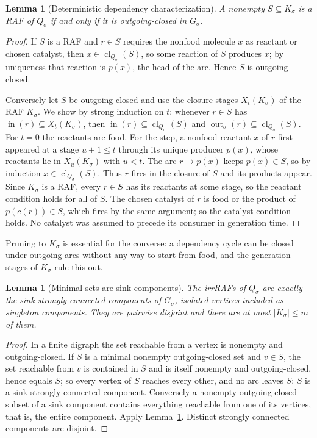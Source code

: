 \documentclass[11pt,a4paper]{article}
\theoremstyle{plain}
\newtheorem{lemma}[theorem]{Lemma}
\theoremstyle{definition}
\theoremstyle{remark}
\newcommand{\cl}{\operatorname{cl}}
\newcommand{\inp}{\operatorname{in}}
\newcommand{\out}{\operatorname{out}}
\begin{document}
\begin{lemma}[Deterministic dependency characterization]\label{lem:det}
A nonempty $S\subseteq K_\sigma$ is a RAF of $Q_\sigma$ if and only if it is outgoing-closed in $G_\sigma$.
\end{lemma}
\begin{proof}
If $S$ is a RAF and $r\in S$ requires the nonfood molecule $x$ as reactant or chosen catalyst, then $x\in\cl_{Q_\sigma}(S)$, so some reaction of $S$ produces $x$; by uniqueness that reaction is $p(x)$, the head of the arc. Hence $S$ is outgoing-closed.

Conversely let $S$ be outgoing-closed and use the closure stages $X_t(K_\sigma)$ of the RAF $K_\sigma$. We show by strong induction on $t$: whenever $r\in S$ has $\inp(r)\subseteq X_t(K_\sigma)$, then $\inp(r)\subseteq\cl_{Q_\sigma}(S)$ and $\out_\sigma(r)\subseteq\cl_{Q_\sigma}(S)$. For $t=0$ the reactants are food. For the step, a nonfood reactant $x$ of $r$ first appeared at a stage $u+1\le t$ through its unique producer $p(x)$, whose reactants lie in $X_u(K_\sigma)$ with $u<t$. The arc $r\to p(x)$ keeps $p(x)\in S$, so by induction $x\in\cl_{Q_\sigma}(S)$. Thus $r$ fires in the closure of $S$ and its products appear. Since $K_\sigma$ is a RAF, every $r\in S$ has its reactants at some stage, so the reactant condition holds for all of $S$. The chosen catalyst of $r$ is food or the product of $p(c(r))\in S$, which fires by the same argument; so the catalyst condition holds. No catalyst was assumed to precede its consumer in generation time.
\end{proof}

Pruning to $K_\sigma$ is essential for the converse: a dependency cycle can be closed under outgoing arcs without any way to start from food, and the generation stages of $K_\sigma$ rule this out.

\begin{lemma}[Minimal sets are sink components]\label{lem:sink}
The irrRAFs of $Q_\sigma$ are exactly the sink strongly connected components of $G_\sigma$, isolated vertices included as singleton components. They are pairwise disjoint and there are at most $|K_\sigma|\le m$ of them.
\end{lemma}
\begin{proof}
In a finite digraph the set reachable from a vertex is nonempty and outgoing-closed. If $S$ is a minimal nonempty outgoing-closed set and $v\in S$, the set reachable from $v$ is contained in $S$ and is itself nonempty and outgoing-closed, hence equals $S$; so every vertex of $S$ reaches every other, and no arc leaves $S$: $S$ is a sink strongly connected component. Conversely a nonempty outgoing-closed subset of a sink component contains everything reachable from one of its vertices, that is, the entire component. Apply Lemma~\ref{lem:det}. Distinct strongly connected components are disjoint.
\end{proof}
\end{document}
